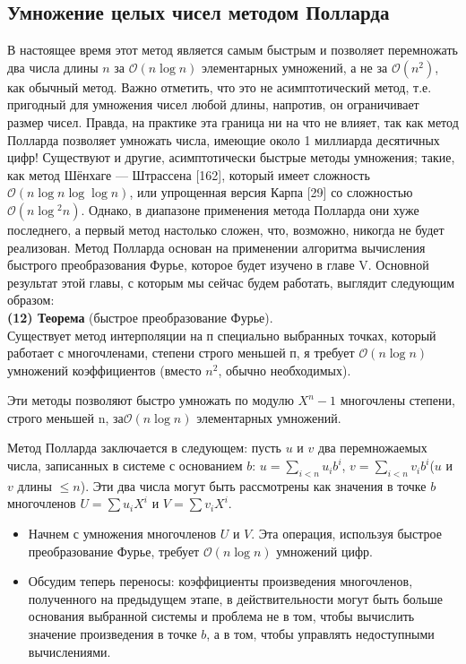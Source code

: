 \documentclass{mai_book}
\begin{document}
\subsection{Умножение целых чисел методом Полларда}
В настоящее время этот метод является самым быстрым и позволяет
перемножать два числа длины $n$ за $\mathcal{O}(n\log{}n)$ элементарных 
умножений, а не за $\mathcal{O}(n^{2})$, как обычный метод. Важно отметить, что это не асимптотический метод, т.е. пригодный для умножения чисел любой
длины, напротив, он ограничивает размер чисел. Правда, на 
практике эта граница ни на что не влияет, так как метод Полларда 
позволяет умножать числа, имеющие около 1 миллиарда десятичных цифр!
Существуют и другие, асимптотически быстрые методы умножения;
такие, как метод Шёнхаге — Штрассена [162], который имеет 
сложность $\mathcal{O}(n\log{}n\log{}\log{}n)$, или упрощенная версия Карпа [29] со сложностью $\mathcal{O}(n\log{}^{2}n)$. Однако, в диапазоне применения метода Полларда они хуже последнего, а первый метод настолько сложен, что, возможно, никогда не будет реализован.
\pagebreak
\newpage
Метод Полларда основан на применении алгоритма вычисления 
быстрого преобразования Фурье, которое будет изучено в главе V. 
Основной результат этой главы, с которым мы сейчас будем работать, 
выглядит следующим образом: \\
\textbf{(12) Теорема} (быстрое преобразование Фурье).\\
Существует метод интерполяции на п специально выбранных 
точках, который работает с многочленами, степени строго меньшей п, я
требует $\mathcal{O}(n\log{}n)$ умножений коэффициентов (вместо $n^{2}$, обычно необходимых).\par
Эти методы позволяют быстро умножать по модулю $X^{n} - 1$ 
многочлены степени, строго меньшей n, за$\mathcal{O}(n\log{}n)$ элементарных 
умножений.\par
 Метод Полларда заключается в следующем: пусть $u$ и $v$ два 
перемножаемых числа, записанных в системе с основанием $b$: $u = \sum_{i<n}u_{i}b^{i}$, $v = \sum_{i < n}v_{i}b^{i}$($u$ и $v$ длины $\leq n$). Эти два числа могут быть рассмотрены как значения в точке $b$ многочленов $U = \sum u_{i}X^{i}$ и $V = \sum v_{i}X^{i}$.
\begin{itemize}
\item Начнем с умножения многочленов $U$ и $V$. Эта операция, 
используя быстрое преобразование Фурье, требует $\mathcal{O}(n\log{}n)$  умножений цифр.
\item Обсудим теперь переносы: коэффициенты произведения 
многочленов, полученного на предыдущем этапе, в действительности
могут быть больше основания выбранной системы и проблема не
в том, чтобы вычислить значение произведения в точке $b$, а в том,
чтобы управлять недоступными вычислениями.
\end{itemize}
\end{document}
